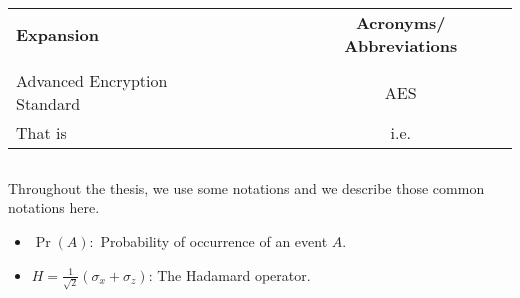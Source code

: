 \newpage
\subsection*{}

\begin{table}[h]
	\begin{tabular}{llc}
		{\large \textbf{Expansion}} & $~~~~~~~~~$ & {\large \textbf{Acronyms/ Abbreviations}} \\
		&&\\
		Advanced Encryption Standard 					& & AES\\
		That is											& & i.e.\\
	\end{tabular}
\end{table}



\newpage
\subsection*{}
Throughout the thesis, we use some notations and we describe those common notations here.

\begin{itemize}
	\item $\Pr(A):$ Probability of occurrence of an event $A$.
	\item $H=\frac{1}{\sqrt{2}}(\sigma_x+\sigma_z)$: The Hadamard operator.
\end{itemize}
